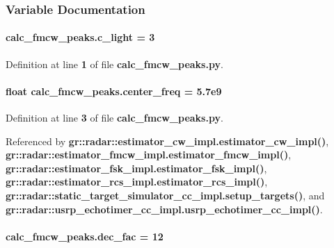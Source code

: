 \subsubsection{Variable Documentation}
\paragraph[{c\+\_\+light}]{ calc\+\_\+fmcw\+\_\+peaks.\+c\+\_\+light = 3}\label{namespacecalc__fmcw__peaks_a13cba53534c284098878b3edfdaf0eb3}


Definition at line {\bf 1} of file {\bf calc\+\_\+fmcw\+\_\+peaks.\+py}.

\paragraph[{center\+\_\+freq}]{\setlength{\rightskip}{0pt plus 5cm}float calc\+\_\+fmcw\+\_\+peaks.\+center\+\_\+freq = 5.\+7e9}\label{namespacecalc__fmcw__peaks_abab6dc09bd38a5c93b48e9835d6a83b2}


Definition at line {\bf 3} of file {\bf calc\+\_\+fmcw\+\_\+peaks.\+py}.



Referenced by {\bf gr\+::radar\+::estimator\+\_\+cw\+\_\+impl.\+estimator\+\_\+cw\+\_\+impl()}, {\bf gr\+::radar\+::estimator\+\_\+fmcw\+\_\+impl.\+estimator\+\_\+fmcw\+\_\+impl()}, {\bf gr\+::radar\+::estimator\+\_\+fsk\+\_\+impl.\+estimator\+\_\+fsk\+\_\+impl()}, {\bf gr\+::radar\+::estimator\+\_\+rcs\+\_\+impl.\+estimator\+\_\+rcs\+\_\+impl()}, {\bf gr\+::radar\+::static\+\_\+target\+\_\+simulator\+\_\+cc\+\_\+impl.\+setup\+\_\+targets()}, and {\bf gr\+::radar\+::usrp\+\_\+echotimer\+\_\+cc\+\_\+impl.\+usrp\+\_\+echotimer\+\_\+cc\+\_\+impl()}.

\paragraph[{dec\+\_\+fac}]{ calc\+\_\+fmcw\+\_\+peaks.\+dec\+\_\+fac = 12}\label{namespacecalc__fmcw__peaks_a2d35e47f00a54a9f7334df47d464befa}


